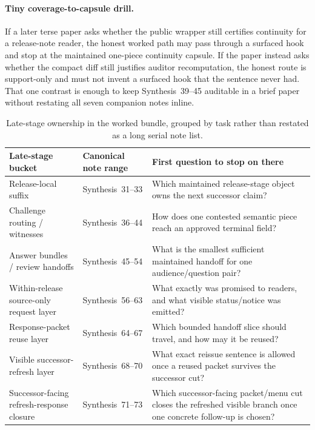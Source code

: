 \documentclass[11pt]{article}
\begin{document}
\paragraph{Tiny coverage-to-capsule drill.}
If a later terse paper asks whether the public wrapper still certifies continuity for a release-note reader, the honest worked path may pass through a surfaced hook and stop at the maintained one-piece continuity capsule.
If the paper instead asks whether the compact diff still justifies auditor recomputation, the honest route is support-only and must not invent a surfaced hook that the sentence never had.
That one contrast is enough to keep Synthesis~39--45 auditable in a brief paper without restating all seven companion notes inline.\cite{series:workedexample}


\begin{table}[t]
\centering
\small
\begin{tabularx}{\linewidth}{@{}Y Y Y@{}}
\toprule
Late-stage bucket & Canonical note range & First question to stop on there \\
\midrule
Release-local suffix & Synthesis~31--33 & Which maintained release-stage object owns the next successor claim? \\
Challenge routing / witnesses & Synthesis~36--44 & How does one contested semantic piece reach an approved terminal field? \\
Answer bundles / review handoffs & Synthesis~45--54 & What is the smallest sufficient maintained handoff for one audience/question pair? \\
Within-release source-only request layer & Synthesis~56--63 & What exactly was promised to readers, and what visible status/notice was emitted? \\
Response-packet reuse layer & Synthesis~64--67 & Which bounded handoff slice should travel, and how may it be reused? \\
Visible successor-refresh layer & Synthesis~68--70 & What exact reissue sentence is allowed once a reused packet survives the successor cut? \\
Successor-facing refresh-response closure & Synthesis~71--73 & Which successor-facing packet/menu cut closes the refreshed visible branch once one concrete follow-up is chosen? \\
\bottomrule
\end{tabularx}
\caption{Late-stage ownership in the worked bundle, grouped by task rather than restated as a long serial note list.}
\label{tab:workedexample-latestage-buckets}
\end{table}
\end{document}
